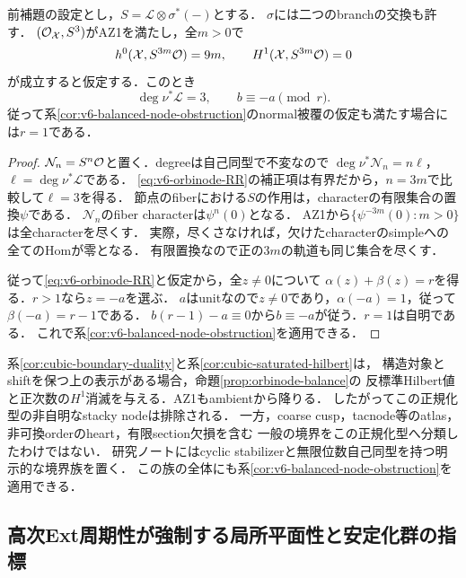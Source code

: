 \documentclass[11pt,a4paper]{ltjsarticle}
\begin{document}
\begin{proposition}\label{prop:orbinode-balance}
前補題の設定とし，$S=\mathcal L\otimes\sigma^*(-)$とする．
$\sigma$には二つのbranchの交換も許す．
$(\mathcal O_{\mathcal X},S^3)$がAZ1を満たし，全$m>0$で
\[
 h^0(\mathcal X,S^{3m}\mathcal O)=9m,\qquad H^1(\mathcal X,S^{3m}\mathcal O)=0
\]
が成立すると仮定する．このとき
\[
 \deg\nu^*\mathcal L=3,\qquad b\equiv-a\pmod r.
\]
従って系\ref{cor:v6-balanced-node-obstruction}のnormal被覆の仮定も満たす場合には$r=1$である．
\end{proposition}

\begin{proof}
$\mathcal N_n=S^n\mathcal O$と置く．degreeは自己同型で不変なので
$\deg\nu^*\mathcal N_n=n\ell$，$\ell=\deg\nu^*\mathcal L$である．
\eqref{eq:v6-orbinode-RR}の補正項は有界だから，$n=3m$で比較して$\ell=3$を得る．
節点のfiberにおける$S$の作用は，characterの有限集合の置換$\psi$である．
$\mathcal N_n$のfiber characterは$\psi^n(0)$となる．
AZ1から$\{\psi^{-3m}(0):m>0\}$は全characterを尽くす．
実際，尽くさなければ，欠けたcharacterのsimpleへの全てのHomが零となる．
有限置換なので正の$3m$の軌道も同じ集合を尽くす．

従って\eqref{eq:v6-orbinode-RR}と仮定から，全$z\ne0$について
$\alpha(z)+\beta(z)=r$を得る．$r>1$なら$z=-a$を選ぶ．
$a$はunitなので$z\ne0$であり，$\alpha(-a)=1$，従って$\beta(-a)=r-1$である．
$b(r-1)-a\equiv0$から$b\equiv-a$が従う．$r=1$は自明である．
これで系\ref{cor:v6-balanced-node-obstruction}を適用できる．
\end{proof}

\begin{remark}[この排除で解決していない範囲]
系\ref{cor:cubic-boundary-duality}と系\ref{cor:cubic-saturated-hilbert}は，
構造対象とshiftを保つ上の表示がある場合，命題\ref{prop:orbinode-balance}の
反標準Hilbert値と正次数の$H^1$消滅を与える．AZ1もambientから降りる．
したがってこの正規化型の非自明なstacky nodeは排除される．
一方，coarse cusp，tacnode等のatlas，非可換orderのheart，有限section欠損を含む
一般の境界をこの正規化型へ分類したわけではない．
研究ノートにはcyclic stabilizerと無限位数自己同型を持つ明示的な境界族を置く．
この族の全体にも系\ref{cor:v6-balanced-node-obstruction}を適用できる．
\end{remark}

\subsection{高次Ext周期性が強制する局所平面性と安定化群の指標}\label{subsec:v7-local-geometry}
\end{document}
